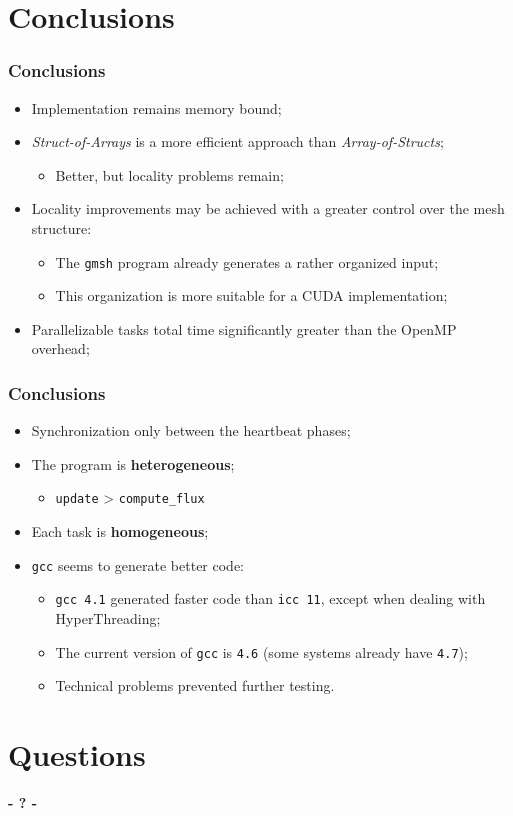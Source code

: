 \documentclass{beamer}
\begin{document}
\section{Conclusions}
\begin{frame}
	\frametitle{Conclusions}
	\begin{itemize}
		\item{Implementation remains memory bound;}
		\pause
		\item{\textit{Struct-of-Arrays} is a more efficient approach than \textit{Array-of-Structs};
		\begin{itemize}
			\item{Better, but locality problems remain;}
		\end{itemize}
		}
		\pause
		\item{Locality improvements may be achieved with a greater control over the mesh structure:
		\begin{itemize}
			\item{The \texttt{gmsh} program already generates a rather organized input;}
			\item{This organization is more suitable for a CUDA implementation;}
		\end{itemize}
		}
		\pause
		\item{Parallelizable tasks total time significantly greater than the OpenMP overhead;}
	\end{itemize}
\end{frame}
\begin{frame}
	\frametitle{Conclusions}
	\begin{itemize}
		\item{Synchronization only between the heartbeat phases;}
		\pause
		\item{The program is \textbf{heterogeneous};
		\begin{itemize}
			\item{\texttt{update} > \texttt{compute\_flux}}
		\end{itemize}
		}
		\pause
		\item{Each task is \textbf{homogeneous};}
		\pause
		\item{\texttt{gcc} seems to generate better code:
		\begin{itemize}
			\item{\texttt{gcc 4.1} generated faster code than \texttt{icc 11}, except when dealing with HyperThreading;}
			\item{The current version of \texttt{gcc} is \texttt{4.6} (some systems already have \texttt{4.7});}
			\item{Technical problems prevented further testing.}
		\end{itemize}
		}
	\end{itemize}
\end{frame}

\section{Questions}
\begin{frame}
	\titlepage
	\begin{center}
		\Huge\bfseries
		- ? -
	\end{center}
\end{frame}
\end{document}

